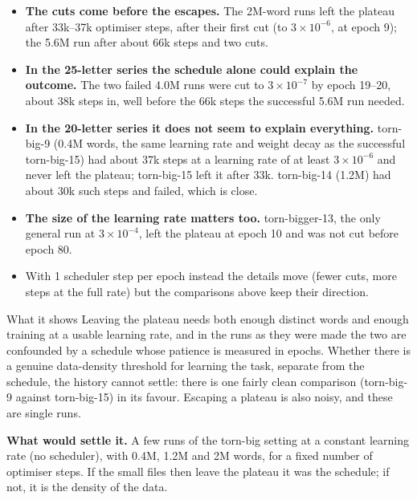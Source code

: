 \documentclass[paper=a4,fontsize=11pt,DIV=11,parskip=half,headings=small,numbers=noendperiod]{scrartcl}
\DeclareRobustCommand{\lead}[1]{\textsf{\bfseries\color{accent}#1}}
\DeclareRobustCommand{\code}[1]{{\fontseries{m}\ttfamily #1}}
\begin{document}
\begin{itemize}
\item \lead{The cuts come before the escapes.} The 2M-word runs left the plateau after 33k–37k optimiser steps,
  after their first cut (to $3\times10^{-6}$, at epoch 9); the 5.6M run after about 66k steps and two cuts.
\item \lead{In the 25-letter series the schedule alone could explain the outcome.} The two failed 4.0M runs were
  cut to $3\times10^{-7}$ by epoch 19–20, about 38k steps in, well before the 66k steps the successful 5.6M run
  needed.
\item \lead{In the 20-letter series it does not seem to explain everything.}
  \code{torn-\allowbreak{}big-\allowbreak{}9} (0.4M words, the same learning rate and weight decay as the
  successful \code{torn-\allowbreak{}big-\allowbreak{}15}) had about 37k steps at a learning rate of at least
  $3\times10^{-6}$ and never left the plateau; \code{torn-\allowbreak{}big-\allowbreak{}15} left it after 33k.
  \code{torn-\allowbreak{}big-\allowbreak{}14} (1.2M) had about 30k such steps and failed, which is close.
\item \lead{The size of the learning rate matters too.} \code{torn-\allowbreak{}bigger-\allowbreak{}13}, the
  only general run at $3\times10^{-4}$, left the plateau at epoch 10 and was not cut before epoch 80.
\item With 1 scheduler step per epoch instead the details move (fewer cuts, more steps at the full rate) but the
  comparisons above keep their direction.
\end{itemize}

\begin{findbox}{What it shows}
Leaving the plateau needs both enough distinct words and enough training at a usable learning rate, and in the
runs as they were made the two are confounded by a schedule whose patience is measured in epochs. Whether there
is a genuine data-density threshold for learning the task, separate from the schedule, the history cannot
settle: there is one fairly clean comparison (\code{torn-\allowbreak{}big-\allowbreak{}9} against
\code{torn-\allowbreak{}big-\allowbreak{}15}) in its favour. Escaping a plateau is also noisy, and these are
single runs.
\end{findbox}

\lead{What would settle it.} A few runs of the \code{torn-\allowbreak{}big} setting at a constant learning rate
(no scheduler), with 0.4M, 1.2M and 2M words, for a fixed number of optimiser steps. If the small files then
leave the plateau it was the schedule; if not, it is the density of the data.
\end{document}
